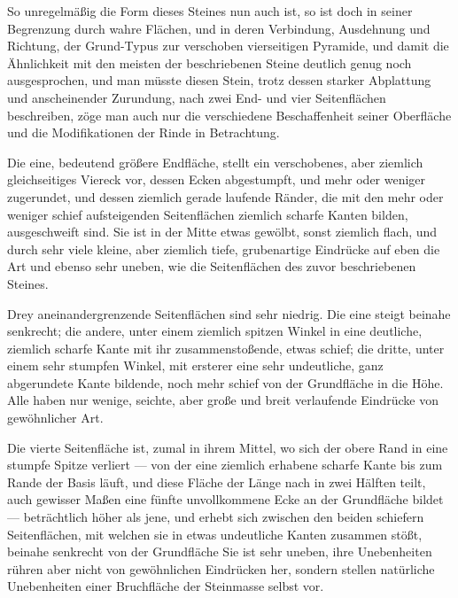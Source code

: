\documentclass[a4paper, 11pt, oneside, german]{article}
\begin{document}
So unregelmäßig die Form dieses Steines nun auch ist, so ist doch in seiner Begrenzung durch wahre Flächen, und in deren Verbindung, Ausdehnung und Richtung, der Grund-Typus zur verschoben vierseitigen Pyramide, und damit die Ähnlichkeit mit den meisten der beschriebenen Steine deutlich genug noch ausgesprochen, und man müsste diesen Stein, trotz dessen starker Abplattung und anscheinender Zurundung, nach zwei End- und vier Seitenflächen beschreiben, zöge man auch nur die verschiedene Beschaffenheit seiner Oberfläche und die Modifikationen der Rinde in Betrachtung.

Die eine, bedeutend größere Endfläche, stellt ein verschobenes, aber ziemlich gleichseitiges Viereck vor, dessen Ecken abgestumpft, und mehr oder weniger zugerundet, und dessen ziemlich gerade laufende Ränder, die mit den mehr oder weniger schief aufsteigenden Seitenflächen ziemlich scharfe Kanten bilden, ausgeschweift sind. Sie ist in der Mitte etwas gewölbt, sonst ziemlich flach, und durch sehr viele kleine, aber ziemlich tiefe, grubenartige Eindrücke auf eben die Art und ebenso sehr uneben, wie die Seitenflächen des zuvor beschriebenen Steines.

Drey aneinandergrenzende Seitenflächen sind sehr niedrig. Die eine steigt beinahe senkrecht; die andere, unter einem ziemlich spitzen Winkel in eine deutliche, ziemlich scharfe Kante mit ihr zusammenstoßende, etwas schief; die dritte, unter einem sehr stumpfen Winkel, mit ersterer eine sehr undeutliche, ganz abgerundete Kante bildende, noch mehr schief von der Grundfläche in die Höhe. Alle haben nur wenige, seichte, aber große und breit verlaufende Eindrücke von gewöhnlicher Art.

Die vierte Seitenfläche ist, zumal in ihrem Mittel, wo sich der obere Rand in eine stumpfe Spitze verliert --- von der eine ziemlich erhabene scharfe Kante bis zum Rande der Basis läuft, und diese Fläche der Länge nach in zwei Hälften teilt, auch gewisser Maßen eine fünfte unvollkommene Ecke an der Grundfläche bildet --- beträchtlich höher als jene, und erhebt sich zwischen den beiden schiefern Seitenflächen, mit welchen sie in etwas undeutliche Kanten zusammen stößt, beinahe senkrecht von der Grundfläche Sie ist sehr uneben, ihre Unebenheiten rühren aber nicht von gewöhnlichen Eindrücken her, sondern stellen natürliche Unebenheiten einer Bruchfläche der Steinmasse selbst vor.
\end{document}
